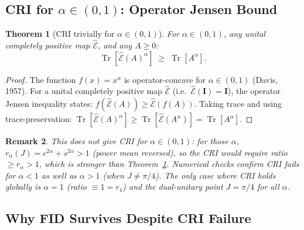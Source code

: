 \documentclass[12pt,a4paper]{article}
\newtheorem{theorem}{Theorem}[section]
\newtheorem{remark}[theorem]{Remark}
\begin{document}
\subsection{CRI for $\alpha\in(0,1)$: Operator Jensen Bound}
\label{sec:cri_jensen}

\begin{theorem}[CRI trivially for $\alpha\in(0,1)$]
\label{thm:cri_jensen}
For $\alpha\in(0,1)$, any unital completely positive map $\hat{\mathcal{E}}$,
and any $A\geq 0$:
\[
  \operatorname{Tr}[\hat{\mathcal{E}}(A)^\alpha]\;\geq\;\operatorname{Tr}[A^\alpha].
\]
\end{theorem}

\begin{proof}
The function $f(x)=x^\alpha$ is operator-concave for $\alpha\in(0,1)$
(Davis, 1957).  For a unital completely positive map $\hat{\mathcal{E}}$
(i.e.\ $\hat{\mathcal{E}}(\mathbf{I})=\mathbf{I}$), the operator Jensen inequality states:
$f(\hat{\mathcal{E}}(A))\geq\hat{\mathcal{E}}(f(A))$.
Taking trace and using trace-preservation:
$\operatorname{Tr}[\hat{\mathcal{E}}(A)^\alpha]\geq\operatorname{Tr}[\hat{\mathcal{E}}(A^\alpha)]
=\operatorname{Tr}[A^\alpha]$.
\end{proof}

\begin{remark}
This does \emph{not} give CRI for $\alpha\in(0,1)$: for those $\alpha$,
$r_\alpha(J)=c^{2\alpha}+s^{2\alpha}>1$ (power mean reversed), so the CRI
would require ratio $\geq r_\alpha>1$, which is stronger than
Theorem~\ref{thm:cri_jensen}.  Numerical checks confirm CRI fails for $\alpha<1$
as well as $\alpha>1$ (when $J\neq\pi/4$).
The \emph{only} case where CRI holds globally is $\alpha=1$ (ratio $\equiv 1=r_1$)
and the dual-unitary point $J=\pi/4$ for all $\alpha$.
\end{remark}

\subsection{Why FID Survives Despite CRI Failure}
\label{sec:fid_survives}
\end{document}
